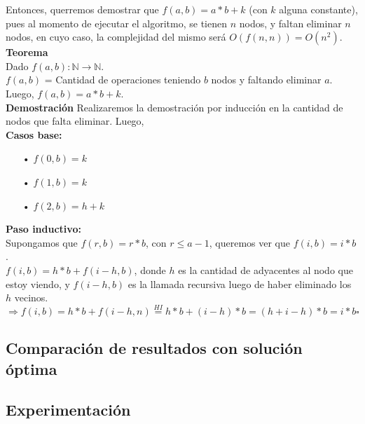 Entonces, querremos demostrar que $f(a,b) = a*b + k$ (con $k$ alguna constante), pues al momento de ejecutar el algoritmo, se tienen $n$ nodos, y faltan eliminar $n$ nodos, en cuyo caso, la complejidad del mismo será $O(f(n,n)) = O(n^{2})$.\\

\textbf{Teorema}\\
Dado $f(a,b): \mathbb{N} \rightarrow \mathbb{N}$.\\
$f(a,b)$ = Cantidad de operaciones teniendo $b$ nodos y faltando eliminar $a$.\\
Luego, $f(a,b) = a*b + k$.\\

\textbf{Demostración}
Realizaremos la demostración por inducción en la cantidad de nodos que falta eliminar.
Luego,\\
\textbf{Casos base:}
\begin{itemize}
	\item[•] $f(0,b) = k$ 
    \item[•] $f(1,b) = k$ 
    \item[•] $f(2,b) = h + k$     
\end{itemize}
\textbf{Paso inductivo:}\\
Supongamos que $f(r,b) = r*b$, con $r \leq a-1$, queremos ver que $f(i,b) = i*b$.\\
$f(i,b) = h*b + f(i-h,b)$, donde $h$ es la cantidad de adyacentes al nodo que estoy viendo, y $f(i-h,b)$ es la llamada recursiva luego de haber eliminado los $h$ vecinos.\\
$\Rightarrow f(i,b) = h*b + f(i-h,n) \stackrel{HI}{=} h*b + (i-h)*b = (h + i -h)*b = i*b \square$


\subsection{Comparaci\'on de resultados con soluci\'on \'optima}
\subsection{Experimentaci\'on}
